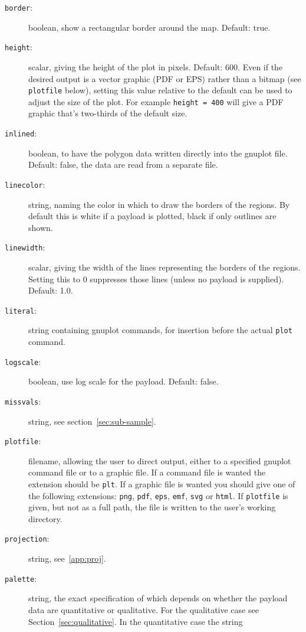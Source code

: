 \documentclass{article}
\begin{document}
\begin{description}
\item[\texttt{border}:] boolean, show a rectangular border around the
  map. Default: true.
\item[\texttt{height}:] scalar, giving the height of the plot in
  pixels. Default: 600. Even if the desired output is a vector graphic
  (PDF or EPS) rather than a bitmap (see \texttt{plotfile} below),
  setting this value relative to the default can be used to adjust the
  size of the plot. For example \texttt{height = 400} will give a PDF
  graphic that's two-thirds of the default size.
\item[\texttt{inlined}:] boolean, to have the polygon data written
  directly into the \textsf{gnuplot} file. Default: false, the data
  are read from a separate file.
\item[\texttt{linecolor}:] string, naming the color in which to draw
  the borders of the regions. By default this is white if a payload is
  plotted, black if only outlines are shown.
\item[\texttt{linewidth}:] scalar, giving the width of the lines
  representing the borders of the regions. Setting this to 0
  suppresses those lines (unless no payload is supplied). Default:
  1.0.
\item[\texttt{literal}:] string containing \textsf{gnuplot} commands,
  for insertion before the actual \texttt{plot} command.
\item[\texttt{logscale}:] boolean, use log scale for the
  payload. Default: false.
\item[\texttt{missvals}:] string, see section~\ref{sec:sub-sample}.
\item[\texttt{plotfile}:] filename, allowing the user to direct
  output, either to a specified \textsf{gnuplot} command file or to a
  graphic file. If a command file is wanted the extension should be
  \texttt{plt}. If a graphic file is wanted you should give one of the
  following extensions: \texttt{png}, \texttt{pdf}, \texttt{eps},
  \texttt{emf}, \texttt{svg} or \texttt{html}.  If \texttt{plotfile}
  is given, but not as a full path, the file is written to the user's
  working directory.
\item[\texttt{projection}:] string, see~\ref{app:proj}.
\item[\texttt{palette}:] string, the exact specification of which
  depends on whether the payload data are quantitative or
  qualitative. For the qualitative case see
  Section~\ref{sec:qualitative}. In the quantitative case the string

\end{description}
\end{document}
